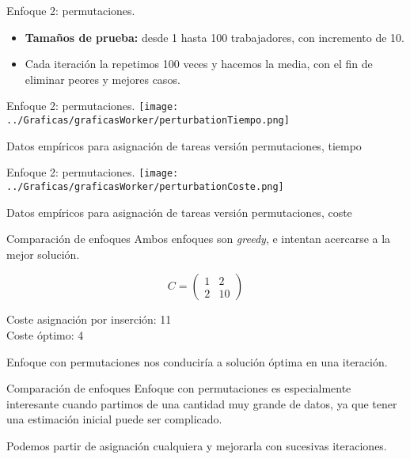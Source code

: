 \documentclass[10pt, xcolor=table]{beamer}
\begin{document}
\begin{frame}{Enfoque 2: permutaciones. }
\begin{itemize}
	\item \textbf{Tamaños de prueba:} desde 1 hasta 100 trabajadores, con incremento de 10.
	\item Cada iteración la repetimos 100 veces y hacemos la media, con el fin de eliminar peores y mejores casos.
\end{itemize}
\end{frame}

\begin{frame}[fragile]{Enfoque 2: permutaciones. }
\texttt{[image: ../Graficas/graficasWorker/perturbationTiempo.png]}
\begin{center}
	\footnotesize{Datos empíricos para asignación de tareas versión permutaciones, tiempo}
\end{center}
\end{frame}

\begin{frame}[fragile]{Enfoque 2: permutaciones. }
\texttt{[image: ../Graficas/graficasWorker/perturbationCoste.png]}
\begin{center}
	\footnotesize{Datos empíricos para asignación de tareas versión permutaciones, coste}
\end{center}
\end{frame}

\begin{frame}{Comparación de enfoques}
Ambos enfoques son \emph{greedy}, e intentan acercarse a la mejor solución.

$$C=\left(\begin{matrix}1&2\\2&10\end{matrix}\right)$$

\begin{center}
	\footnotesize{Coste asignación por inserción: 11\\Coste óptimo: 4}
\end{center}

Enfoque con permutaciones nos conduciría a solución óptima en una iteración.
\end{frame}

\begin{frame}{Comparación de enfoques}
Enfoque con permutaciones es especialmente interesante cuando partimos de una cantidad muy grande de datos, ya que tener una estimación inicial puede ser complicado.

Podemos partir de asignación cualquiera y mejorarla con sucesivas iteraciones.
\end{frame}
\end{document}
